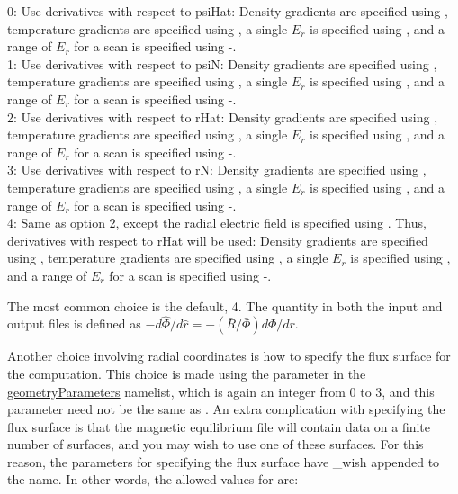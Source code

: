 {\setlength{\parindent}{0cm}

0: Use derivatives with respect to {\ttfamily psiHat}: Density gradients are specified using , 
temperature gradients are specified using ,  a single $E_r$ is specified using
, and a range of $E_r$ for a scan is specified using -.
\\

1: Use derivatives with respect to {\ttfamily psiN}: Density gradients are specified using , 
temperature gradients are specified using ,  a single $E_r$ is specified using
, and a range of $E_r$ for a scan is specified using -.
\\

2: Use derivatives with respect to {\ttfamily rHat}: Density gradients are specified using , 
temperature gradients are specified using ,  a single $E_r$ is specified using
, and a range of $E_r$ for a scan is specified using -.
\\

3: Use derivatives with respect to {\ttfamily rN}: Density gradients are specified using , 
temperature gradients are specified using ,  a single $E_r$ is specified using
, and a range of $E_r$ for a scan is specified using -.
\\

4: Same as option 2, except the radial electric field is specified using . Thus, derivatives with respect to {\ttfamily rHat} will be used:
Density gradients are specified using , 
temperature gradients are specified using ,  a single $E_r$ is specified using
, and a range of $E_r$ for a scan is specified using -.
\\
}

The most common choice is the default, 4.  The quantity  in both the input and output files is defined as 
$- d\hat{\Phi} / d \hat{r} = -(\bar{R} / \bar{\Phi}) d \Phi / d r$.

Another choice involving radial coordinates is how to specify the flux surface for the computation.
This choice is made using the parameter  in the {\ttfamily \hyperref[sec:geometryParameters]{geometryParameters}}
namelist, which is again an integer from 0 to 3, and this parameter need not be the same as .
An extra complication with specifying the flux surface is that the magnetic equilibrium file will contain data on a finite number of surfaces,
and you may wish to use one of these surfaces.  For this reason, the parameters for specifying the flux surface have {\ttfamily \_wish}
appended to the name. In other words, the allowed values for  are:\\

